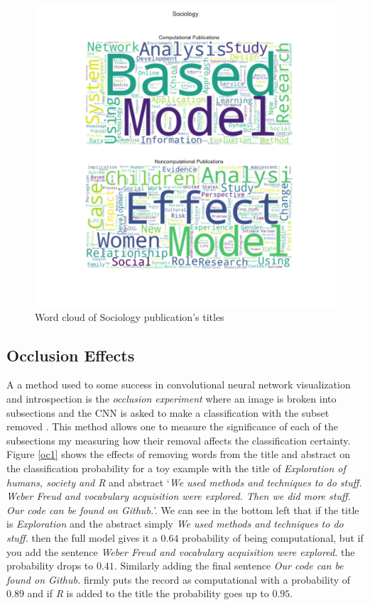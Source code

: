 \documentclass[12pt, a4paper]{article}
\begin{document}
\begin{figure}[H]
	\centering
	\includegraphics[width=\textwidth]{wc_Sociology}
	\caption{Word cloud of Sociology publication's titles}\label{wc}
\end{figure}

\subsection{Occlusion Effects}

A a method used to some success in convolutional neural network visualization and introspection is the \textit{occlusion experiment} where an image is broken into subsections and the CNN is asked to make a classification with the subset removed \citep{zeiler2014visualizing}. This method allows one to measure the significance of each of the subsections my measuring how their removal affects the classification certainty. Figure \ref{oc1} shows the effects of removing words from the title and abstract on the classification probability for a toy example with the title of \textit{Exploration of humans, society and R} and abstract `\textit{We used methods and techniques to do stuff. Weber Freud and vocabulary acquisition were explored. Then we did more stuff. Our code can be found on Github.}'. We can see in the bottom left that if the title is \textit{Exploration} and the abstract simply \textit{We used methods and techniques to do stuff.} then the full model gives it a $0.64$ probability of being computational, but if you add the sentence \textit{Weber Freud and vocabulary acquisition were explored.} the probability drops to $0.41$. Similarly adding the final sentence \textit{Our code can be found on Github.} firmly puts the record as computational with a probability of $0.89$ and if \textit{R} is added to the title the probability goes up to $0.95$.
\end{document}
